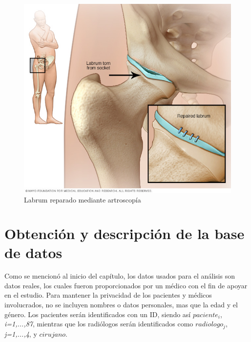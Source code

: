 \documentclass[11pt]{book}
\newcommand{\forceindent}{\leavevmode{\parindent=2em\indent}} %
\begin{document}
			
	        \begin{figure}[h]
	        	\begin{center}
	        		\centering
	        		\includegraphics[scale=.2]{labrumreparado}
	        		\caption{Labrum reparado mediante artroscopía}
	        		\label{fig:labrumreparado}
	        	\end{center}
	        \end{figure}			

				
		
			
			\section{Obtención y descripción de la base de datos}
			
			\forceindent Como se mencionó al inicio del capítulo, los datos usados para el análisis son datos reales, los cuales fueron proporcionados por un médico con el fin de apoyar en el estudio. Para mantener la privacidad de los pacientes y médicos involucrados, no se incluyen nombres o datos personales, mas que la edad y el género. Los pacientes serán identificados con un ID, siendo así $paciente_{i}$, \textit{i=1,...,87}, mientras que los radiólogos serán identificados como $radiologo_{j}$, \textit{j=1,...,4}, y $cirujano$.
			
\end{document}
